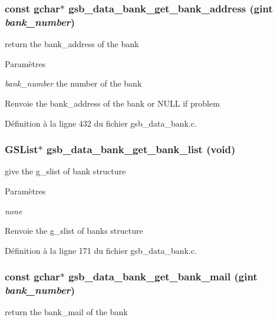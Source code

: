 \subsubsection[{gsb\_\-data\_\-bank\_\-get\_\-bank\_\-address}]{\setlength{\rightskip}{0pt plus 5cm}const gchar$\ast$ gsb\_\-data\_\-bank\_\-get\_\-bank\_\-address (gint {\em bank\_\-number})}\label{gsb__data__bank_8c_ac14e4a008f5bfd0907ce034f12a6a845}
return the bank\_\-address of the bank


\begin{DoxyParams}{Paramètres}
\item[{\em bank\_\-number}]the number of the bank\end{DoxyParams}
\begin{DoxyReturn}{Renvoie}
the bank\_\-address of the bank or NULL if problem 
\end{DoxyReturn}


Définition à la ligne 432 du fichier gsb\_\-data\_\-bank.c.

\subsubsection[{gsb\_\-data\_\-bank\_\-get\_\-bank\_\-list}]{\setlength{\rightskip}{0pt plus 5cm}GSList$\ast$ gsb\_\-data\_\-bank\_\-get\_\-bank\_\-list (void)}\label{gsb__data__bank_8c_a0e4a0af8810f138e45e0965d99f17f31}
give the g\_\-slist of bank structure


\begin{DoxyParams}{Paramètres}
\item[{\em none}]\end{DoxyParams}
\begin{DoxyReturn}{Renvoie}
the g\_\-slist of banks structure 
\end{DoxyReturn}


Définition à la ligne 171 du fichier gsb\_\-data\_\-bank.c.

\subsubsection[{gsb\_\-data\_\-bank\_\-get\_\-bank\_\-mail}]{\setlength{\rightskip}{0pt plus 5cm}const gchar$\ast$ gsb\_\-data\_\-bank\_\-get\_\-bank\_\-mail (gint {\em bank\_\-number})}\label{gsb__data__bank_8c_a81d9d84a24978b647f915e9b927b5a1c}
return the bank\_\-mail of the bank


